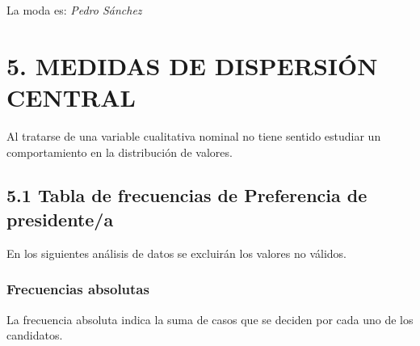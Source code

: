 \documentclass[
  12 pt,
  a4paper,
]{article}
\newenvironment{Shaded}{\begin{snugshade}}{\end{snugshade}}
\newcommand{\AttributeTok}[1]{\textcolor[rgb]{0.13,0.29,0.53}{#1}}
\newcommand{\CommentTok}[1]{\textcolor[rgb]{0.56,0.35,0.01}{\textit{#1}}}
\newcommand{\FunctionTok}[1]{\textcolor[rgb]{0.13,0.29,0.53}{\textbf{#1}}}
\newcommand{\NormalTok}[1]{#1}
\newcommand{\SpecialCharTok}[1]{\textcolor[rgb]{0.81,0.36,0.00}{\textbf{#1}}}
\newcommand{\StringTok}[1]{\textcolor[rgb]{0.31,0.60,0.02}{#1}}
\begin{document}
La moda es: \emph{Pedro Sánchez}

\newpage

\hypertarget{medidas-de-dispersiuxf3n-central}{%
\section{5. MEDIDAS DE DISPERSIÓN
CENTRAL}\label{medidas-de-dispersiuxf3n-central}}

Al tratarse de una variable cualitativa nominal no tiene sentido
estudiar un comportamiento en la distribución de valores.

\hypertarget{tabla-de-frecuencias-de-preferencia-de-presidentea}{%
\subsection{5.1 Tabla de frecuencias de Preferencia de
presidente/a}\label{tabla-de-frecuencias-de-preferencia-de-presidentea}}

En los siguientes análisis de datos se excluirán los valores no válidos.

\hypertarget{frecuencias-absolutas}{%
\subsubsection{Frecuencias absolutas}\label{frecuencias-absolutas}}

La frecuencia absoluta indica la suma de casos que se deciden por cada
uno de los candidatos.

\begin{Shaded}
\end{Shaded}
\end{document}
